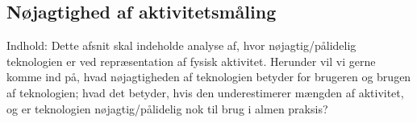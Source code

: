 \subsection{Nøjagtighed af aktivitetsmåling}
Indhold: Dette afsnit skal indeholde analyse af, hvor nøjagtig/pålidelig teknologien er ved repræsentation af fysisk aktivitet. Herunder vil vi gerne komme ind på, hvad nøjagtigheden af teknologien betyder for brugeren og brugen af teknologien; hvad det betyder, hvis den underestimerer mængden af aktivitet, og er teknologien nøjagtig/pålidelig nok til brug i almen praksis?
